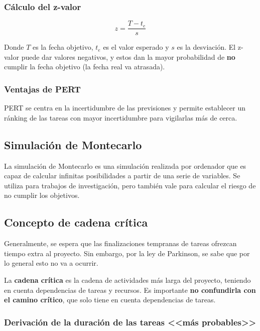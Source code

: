\documentclass[12pt]{article}
\begin{document}
\subsubsection{Cálculo del z-valor}
\label{7.10.6}

\begin{equation}
    z = \frac{T - t_e}{s}
\end{equation}

{Donde $T$ es la fecha objetivo, $t_e$ es el valor esperado y $s$ es la desviación. El z-valor puede dar valores negativos, y estos dan la mayor probabilidad de \textbf{no} cumplir la fecha objetivo (la fecha real va atrasada).}

\subsubsection{Ventajas de PERT}
\label{7.10.7}

{PERT se centra en la incertidumbre de las previsiones y permite establecer un ránking de las tareas con mayor incertidumbre para vigilarlas más de cerca.}

\newpage
\subsection{Simulación de Montecarlo}
\label{7.11.0}

{La simulación de Montecarlo es una simulación realizada por ordenador que es capaz de calcular infinitas posibilidades a partir de una serie de variables. Se utiliza para trabajos de investigación, pero también vale para calcular el riesgo de no cumplir los objetivos.}

\subsection{Concepto de cadena crítica}
\label{7.12.0}

{Generalmente, se espera que las finalizaciones tempranas de tareas ofrezcan tiempo extra al proyecto. Sin embargo, por la ley de Parkinson, se sabe que por lo general esto no va a ocurrir.} \bigskip

{La \textbf{cadena crítica} es la cadena de actividades más larga del proyecto, teniendo en cuenta dependencias de tareas y recursos. Es importante \textbf{no confundirla con el camino crítico}, que solo tiene en cuenta dependencias de tareas.}

\subsubsection{Derivación de la duración de las tareas <<más probables>>}
\label{7.12.1}
\end{document}
